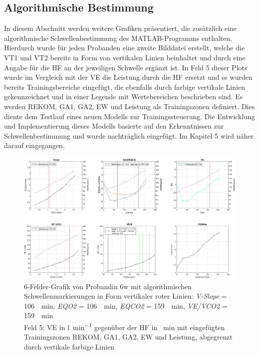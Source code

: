 \subsection{Algorithmische Bestimmung}
%
In diesem Abschnitt werden weitere Grafiken präsentiert, die zusätzlich eine algorithmische Schwellenbestimmung des MATLAB-Programms enthalten. Hierdurch wurde für jeden Probanden eine zweite Bilddatei erstellt, welche die VT1 und VT2 bereits in Form von vertikalen Linien beinhaltet und durch eine Angabe für die \gls{HF} an der jeweiligen Schwelle ergänzt ist. In Feld 5 dieser Plots wurde im Vergleich mit der \gls{VE} die Leistung durch die \gls{HF} ersetzt und es wurden bereits Trainingsbereiche eingefügt, die ebenfalls durch farbige vertikale Linien gekennzeichnet und in einer Legende mit Wertebereichen beschrieben sind. Es werden \gls{REKOM}, \gls{GA1}, \gls{GA2}, \gls{EW} und Leistung als Trainingszonen definiert. Dies diente dem Testlauf eines neuen Modells zur Trainingssteuerung. Die Entwicklung und Implementierung dieses Modells basierte auf den Erkenntnissen zur Schwellenbestimmung und wurde nachträglich eingefügt. Im Kapitel 5 wird näher darauf eingegangen.
%
\begin{figure}[H]
	\centering
	\noindent\includegraphics[angle=0,width=\linewidth,keepaspectratio]{Bilder/auto_6}
	\caption[6-Felder-Grafik von Probandin 6w mit algorithmischen Schwellenmarkierungen]{6-Felder-Grafik von Probandin 6w mit algorithmischen Schwellenmarkierungen in Form vertikaler roter Linien: \textsl{V-Slope} = \SI{106}{\per\minute}, \textsl{\gls{EQO2}} = \SI{106}{\per\minute}, \textsl{\gls{EQCO2}} = \SI{159}{\per\minute}, \textsl{\gls{VE}/\gls{VCO2}} = \SI{159}{\per\minute}\\Feld 5: \gls{VE} in \si{\litre\per\minute} gegenüber der \gls{HF} in \si{\per\minute} mit eingefügten Trainingszonen \gls{REKOM}, \gls{GA1}, \gls{GA2}, \gls{EW} und Leistung, abgegrenzt durch vertikale farbige Linien}
	\label{pic:pic17}
\end{figure}
